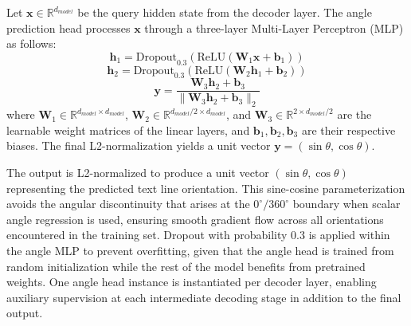 Let $\mathbf{x} \in \mathbb{R}^{d_{model}}$ be the query hidden state from the decoder layer. The angle prediction head processes $\mathbf{x}$ through a three-layer Multi-Layer Perceptron (MLP) as follows:
$$ \mathbf{h}_1 = \text{Dropout}_{0.3}(\text{ReLU}(\mathbf{W}_1 \mathbf{x} + \mathbf{b}_1)) $$
$$ \mathbf{h}_2 = \text{Dropout}_{0.3}(\text{ReLU}(\mathbf{W}_2 \mathbf{h}_1 + \mathbf{b}_2)) $$
$$ \mathbf{y} = \frac{\mathbf{W}_3 \mathbf{h}_2 + \mathbf{b}_3}{\|\mathbf{W}_3 \mathbf{h}_2 + \mathbf{b}_3\|_2} $$
where $\mathbf{W}_1 \in \mathbb{R}^{d_{model} \times d_{model}}$, $\mathbf{W}_2 \in \mathbb{R}^{d_{model}/2 \times d_{model}}$, and $\mathbf{W}_3 \in \mathbb{R}^{2 \times d_{model}/2}$ are the learnable weight matrices of the linear layers, and $\mathbf{b}_1, \mathbf{b}_2, \mathbf{b}_3$ are their respective biases. The final L2-normalization yields a unit vector $\mathbf{y} = (\sin\theta, \cos\theta)$.

The output is L2-normalized to produce a unit vector $(\sin\theta, \cos\theta)$ representing the predicted text line orientation. This sine-cosine parameterization avoids the angular discontinuity that arises at the $0^\circ/360^\circ$ boundary when scalar angle regression is used, ensuring smooth gradient flow across all orientations encountered in the training set. Dropout with probability 0.3 is applied within the angle MLP to prevent overfitting, given that the angle head is trained from random initialization while the rest of the model benefits from pretrained weights. One angle head instance is instantiated per decoder layer, enabling auxiliary supervision at each intermediate decoding stage in addition to the final output.


